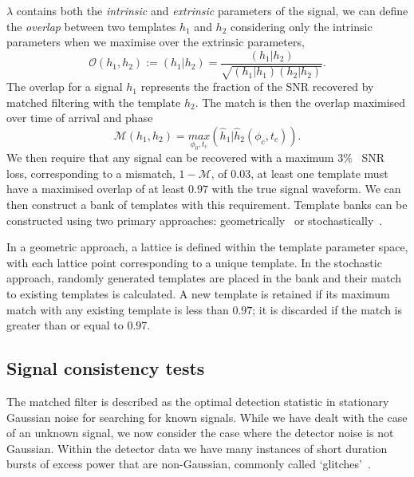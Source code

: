 $\lambda$ contains both the \textit{intrinsic} and \textit{extrinsic} parameters of the signal, we can define the \textit{overlap} between two templates $h_{1}$ and $h_{2}$ considering only the intrinsic parameters when we maximise over the extrinsic parameters,
%
\begin{equation}
    \mathcal{O}(h_{1}, h_{2}) := (h_{1} | h_{2}) = \frac{(h_{1} | h_{2})}{\sqrt{(h_{1} | h_{1})(h_{2} | h_{2})}}.
\end{equation}
%
The overlap for a signal $h_{1}$ represents the fraction of the SNR recovered by matched filtering with the template $h_{2}$. The match is then the overlap maximised over time of arrival and phase~\cite{Harry_Lundgren:2012}
%
\begin{equation}
    \mathcal{M}(h_{1}, h_{2}) = \underset{\phi_0, t_{c}}{max}(\hat{h}_{1}|\hat{h}_{2}(\phi_{c}, t_{c})).
\end{equation}
%
We then require that any signal can be recovered with a maximum $3\%$~\cite{Owen_Sathya:1999} SNR loss, corresponding to a mismatch, $1 - \mathcal{M}$, of $0.03$, at least one template must have a maximised overlap of at least $0.97$ with the true signal waveform. We can then construct a bank of templates with this requirement. Template banks can be constructed using two primary approaches: geometrically~\cite{geom_bank_1:1991, geom_bank_2:1992, geom_bank_3:1995, geom_bank_4:1995, Owen_Sathya:1999} or stochastically~\cite{Harry_sbank:2009, Stochastic_tb:2008}.

In a geometric approach, a lattice is defined within the template parameter space, with each lattice point corresponding to a unique template. In the stochastic approach, randomly generated templates are placed in the bank and their match to existing templates is calculated. A new template is retained if its maximum match with any existing template is less than $0.97$; it is discarded if the match is greater than or equal to $0.97$.

\subsection{\label{2:sec:signal-consistency}Signal consistency tests}

The matched filter is described as the optimal detection statistic in stationary Gaussian noise for searching for known signals. While we have dealt with the case of an unknown signal, we now consider the case where the detector noise is not Gaussian. Within the detector data we have many instances of short duration bursts of excess power that are non-Gaussian, commonly called `glitches'~\cite{LIGO_data_quality:2015}.

